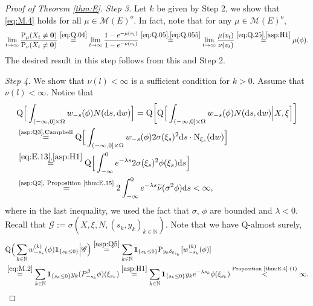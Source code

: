 \documentclass[12pt,a4paper]{amsart}
\numberwithin{equation}{section}
\theoremstyle{plain}
\theoremstyle{definition}
\theoremstyle{remark}
\begin{document}
\begin{proof}[Proof of Theorem \ref{thm:E}]
\emph{Step 3.}
	Let $k$ be given by Step 2, we show that \eqref{eq:M.4} holds for all $\mu\in \mathcal M(E)^o$.
	In fact, note that for any $\mu\in \mathcal M(E)^o$,
\begin{align}
	\lim_{t\to \infty}\frac{\mathrm P_\mu(X_t \neq \mathbf 0)}{\mathrm P_\nu(X_t \neq \mathbf 0)}
	\overset{\eqref{eq:Q.04}} = \lim_{t\to \infty}\frac{1- e^{-\mu(v_t)}}{1- e^{-\nu(v_t)}}
	\overset{\eqref{eq:Q.05}, \eqref{eq:Q.055}} = \lim_{t\to \infty}\frac{\mu(v_t)}{\nu(v_t)}
	\overset{\eqref{eq:Q.25}, \eqref{asp:H1}} = \mu(\phi).
\end{align}
	The desired result in this step follows from this and Step 2.

\emph{Step 4.}
	We show that  $\nu(l)<\infty$ is a sufficient condition for $k>0$.
	Assume that $\nu(l)<\infty$.
	Notice that
\begin{align}
	&\mathrm Q\Big[\int_{(-\infty,0]\times \Omega}w_{-s}(\phi) N({\mathrm d}s, {\mathrm d}w) \Big]
	= \mathrm Q\bigg[\mathrm Q\Big[\int_{(-\infty,0]\times \Omega}w_{-s}(\phi) N({\mathrm d}s, {\mathrm d}w) \Big | X, \xi \Big]\bigg]
	\\& \overset{\text{\eqref{asp:Q3},Campbell}}= \mathrm Q\Big[\int_{(-\infty,0]\times \Omega}w_{-s}(\phi) 2 \sigma(\xi_s)^2 {\mathrm d}s \cdot \mathrm N_{\xi_s}({\mathrm d}w) \Big]
	\\& \overset{\eqref{eq:E.13}, \eqref{asp:H1}}=\mathrm Q \Big[\int^0_{-\infty} e^{-\lambda s} 2\sigma(\xi_s)^2 \phi(\xi_s) \mathrm ds\Big]
	\\&\label{eq:E.64}\overset{\text{\eqref{asp:Q2}, Proposition \ref{thm:E.15}}}= 2\int^0_{-\infty} e^{-\lambda s} \widetilde\nu(\sigma^2 \phi) \mathrm ds
	<\infty,
	\end{align}
	where in the last inequality, we used the fact that $\sigma$, $\phi$ are bounded and $\lambda < 0$.
	Recall that $\mathscr G := \sigma(X, \xi, N, (s_k, y_k)_{k\in \mathbb N})$. Note that we have $\mathrm Q$-almost surely,
\begin{align}
	& \mathrm Q\Big(\sum_{k\in \mathbb N}
	w^{(k)}_{-s_k}(\phi) \mathbf 1_{\{s_k \leq 0\}}\Big|\mathscr G \Big)
	\overset{\eqref{asp:Q5}}= \sum_{k\in \mathbb N} \mathbf 1_{\{s_k \leq 0\}} \mathrm P_{y_k\delta_{\xi_{s_k}}}[w^{(k)}_{-s_k}(\phi)]
	\\ &\overset{\eqref{eq:M.2}}= \sum_{k\in \mathbb N}
	\mathbf 1_{\{s_k \leq 0\}} y_k (P_{-s_k}^\beta \phi)(\xi_{s_k})
	\overset{\eqref{asp:H1}} = \sum_{k\in \mathbb N} \mathbf 1_{\{s_k \leq 0\}} y_k e^{-\lambda s_k} \phi(\xi_{s_k})
	\overset{\text{Proposition \ref{thm:E.4} (1)}} < \infty.

\end{align}
\end{proof}
\end{document}
